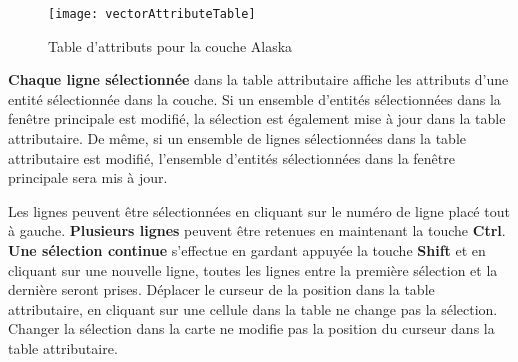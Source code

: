 \begin{figure}[ht]
   \begin{center}
   \texttt{[image: vectorAttributeTable]}
    \caption{Table d'attributs pour la couche Alaska \nixcaption}\label{fig:attributetable}
\end{center} 
\end{figure}


\textbf{Chaque ligne sélectionnée} dans la table attributaire affiche les 
attributs d'une entité sélectionnée dans la couche. Si un ensemble d'entités 
sélectionnées dans la fenêtre principale est modifié, la sélection est également 
mise à jour dans la table attributaire. De même, si un ensemble de lignes 
sélectionnées dans la table attributaire est modifié, l'ensemble d'entités 
sélectionnées dans la fenêtre principale sera mis à jour.

Les lignes peuvent être sélectionnées en cliquant sur le numéro de ligne placé 
tout à gauche. \textbf{Plusieurs lignes} peuvent être retenues en maintenant la 
touche \textbf{Ctrl}. \textbf{Une sélection continue} s'effectue en gardant 
appuyée la touche \textbf{Shift} et en cliquant sur une nouvelle ligne, toutes 
les lignes entre la première sélection et la dernière seront prises. Déplacer le 
curseur de la position dans la table attributaire, en cliquant sur une cellule 
dans la table ne change pas la sélection. Changer la sélection dans la carte ne 
modifie pas la position du curseur dans la table attributaire.

